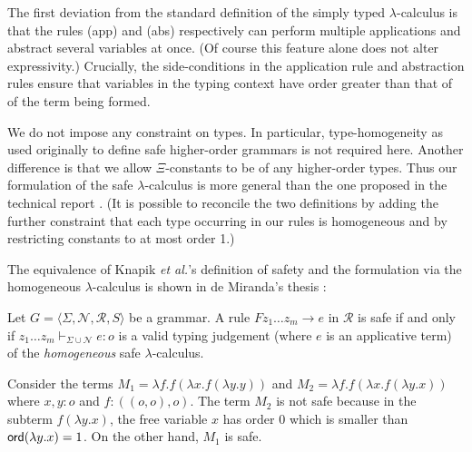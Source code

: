 \documentclass{llncs}
\newcommand\rulef[2]{\frac{\dps #1}{\dps #2}}
\begin{document}
The first deviation from the standard definition of the simply typed
$\lambda$-calculus is that the rules {\sf (app)} and {\sf (abs)}
respectively can perform multiple applications and abstract several
variables at once. (Of course this feature alone does not alter
expressivity.) Crucially, the side-conditions in the application rule
and abstraction rules ensure that variables in the typing context have
order greater than that of of the term being formed.

We do not impose any constraint on types. In particular,
type-homogeneity as used originally to define safe higher-order
grammars \cite{KNU02} is not required here. Another difference is that
we allow $\Xi$-constants to be of any higher-order types.  Thus our
formulation of the safe $\lambda$-calculus is more general than the
one proposed in the technical report \cite{safety-mirlong2004}. (It is
possible to reconcile the two definitions by adding the further
constraint that each type occurring in our rules is homogeneous and by
restricting constants to at most order 1.)

The equivalence of Knapik \emph{et al.}'s definition of safety and the
formulation via the homogeneous $\lambda$-calculus is shown in de
Miranda's thesis \cite{demirandathesis}:
\begin{proposition} Let $G = \langle \Sigma, \mathcal{N}, \mathcal{R},
  S \rangle$ be a grammar.  A rule $F z_1 \ldots z_m \rightarrow e$ in
  $\mathcal{R}$ is safe if and only if $ z_1 \ldots z_m \vdash_{\Sigma
    \cup \mathcal{N}} e : o$ is a valid typing judgement (where $e$ is
  an applicative term) of the \emph{homogeneous} safe
  $\lambda$-calculus.
\end{proposition}



\begin{example}
\label{ex:kierstead}
Consider the terms $M_1 = \lambda f . f (\lambda x . f (\lambda y . y
))$ and $M_2 = \lambda f . f (\lambda x . f (\lambda y .x ))$ where
$x,y:o$ and $f:((o,o),o)$. The term $M_2$ is not safe because in the
subterm $f (\lambda y . x)$, the free variable $x$ has order $0$ which
is smaller than ${\sf ord}(\lambda y . x) = 1$.  On the other hand, $M_1$
is safe.
\end{example}
\end{document}
